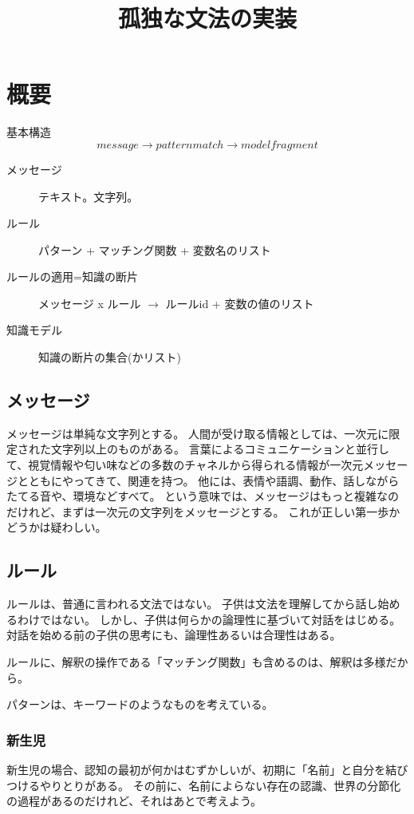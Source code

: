 \documentclass[10pt, oneside]{jarticle}   	%
\title{孤独な文法の実装}
\author{\myname}
\begin{document}
\maketitle

\section{概要}
基本構造
$$message \to pattern match \to model fragment$$

\begin{description}
\item[メッセージ] テキスト。文字列。
\item[ ルール] パターン + マッチング関数 + 変数名のリスト
\item[ルールの適用=知識の断片] メッセージ x ルール $\to$ ルールid + 変数の値のリスト
\item[知識モデル] 知識の断片の集合(かリスト)
\end{description}

\subsection{メッセージ}
メッセージは単純な文字列とする。
人間が受け取る情報としては、一次元に限定された文字列以上のものがある。
言葉によるコミュニケーションと並行して、視覚情報や匂い味などの多数のチャネルから得られる情報が一次元メッセージとともにやってきて、関連を持つ。
他には、表情や語調、動作、話しながらたてる音や、環境などすべて。
という意味では、メッセージはもっと複雑なのだけれど、まずは一次元の文字列をメッセージとする。
これが正しい第一歩かどうかは疑わしい。

\subsection{ルール}
ルールは、普通に言われる文法ではない。
子供は文法を理解してから話し始めるわけではない。
しかし、子供は何らかの論理性に基づいて対話をはじめる。
対話を始める前の子供の思考にも、論理性あるいは合理性はある。

ルールに、解釈の操作である「マッチング関数」も含めるのは、解釈は多様だから。

パターンは、キーワードのようなものを考えている。

\subsubsection{新生児}
新生児の場合、認知の最初が何かはむずかしいが、初期に「名前」と自分を結びつけるやりとりがある。
その前に、名前によらない存在の認識、世界の分節化の過程があるのだけれど、それはあとで考えよう。
\end{document}
